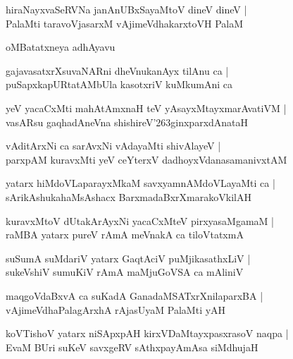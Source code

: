 \documentclass[twoside,12pt,openright]{book}
\def\S{\char'263}
\newcounter{shloka}[chapter]
\begin{document}
\begin{shloka}%
hiraNayxvaSeRVNa janAnUBxSayaMtoV dineV dineV |\\
PalaMti taravoVjasarxM vAjimeVdhakarxtoVH PalaM
\end{shloka}

\begin{center}
oMBatatxneya adhAyavu
\end{center}

\begin{shloka}%
gajavasatxrXsuvaNARni dheVnukanAyx tilAnu ca |\\
puSapxkapURtatAMbUla kasotxriV kuMkumAni ca 
\end{shloka}

\begin{shloka}%
yeV yacaCxMti mahAtAmxnaH teV yAsayxMtayxmarAvatiVM |\\
vasARsu gaqhadAneVna shishireV\S ginxparxdAnataH 
\end{shloka}

\begin{shloka}%
vAditArxNi ca sarAvxNi vAdayaMti shivAlayeV |\\
parxpAM kuravxMti yeV ceYterxV dadhoyxVdanasamanivxtAM 
\end{shloka}

\begin{shloka}%
yatarx hiMdoVLaparayxMkaM savxyamnAMdoVLayaMti ca |\\
sArikAshukahaMsAshacx BarxmadaBxrXmarakoVkilAH
\end{shloka}

\begin{shloka}%
kuravxMtoV dUtakArAyxNi yacaCxMteV pirxyasaMgamaM |\\
raMBA yatarx pureV rAmA meVnakA ca tiloVtatxmA 
\end{shloka}

\begin{shloka}%
suSumA suMdariV yatarx GaqtAciV puMjikasathxLiV |\\
sukeVshiV sumuKiV rAmA maMjuGoVSA ca mAliniV 
\end{shloka}

\begin{shloka}%
maqgoVdaBxvA ca suKadA GanadaMSATxrXnilaparxBA |\\
vAjimeVdhaPalagArxhA rAjasUyaM PalaMti yAH 
\end{shloka}

\begin{shloka}%
koVTishoV yatarx niSApxpAH kirxVDaMtayxpasxrasoV naqpa |\\
EvaM BUri suKeV savxgeRV sAthxpayAmAsa siMdhujaH 
\end{shloka}
\end{document}
